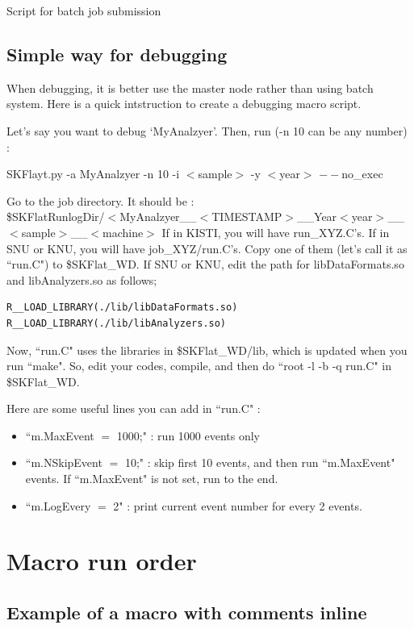 \documentclass[12pt, a4paper, titlepage]{article}
\begin{document}
Script for batch job submission

\subsection{Simple way for debugging}

When debugging, it is better use the master node rather than using batch system.
Here is a quick intstruction to create a debugging macro script.

Let's say you want to debug `MyAnalzyer'.
Then, run (-n 10 can be any number) : \\
\centerline{SKFlayt.py -a MyAnalzyer -n 10 -i $<$sample$>$ -y $<$year$>$ $--$no\_exec}
Go to the job directory. It should be : \\
\$SKFlatRunlogDir/$<$MyAnalzyer\_\_$<$TIMESTAMP$>$\_\_Year$<$year$>$\_\_$<$sample$>$\_\_$<$machine$>$
If in KISTI, you will have run\_XYZ.C's.
If in SNU or KNU, you will have job\_XYZ/run.C's.
Copy one of them (let's call it as ``run.C") to \$SKFlat\_WD.
If SNU or KNU, edit the path for libDataFormats.so and libAnalyzers.so as follows;
\begin{lstlisting}
R__LOAD_LIBRARY(./lib/libDataFormats.so)
R__LOAD_LIBRARY(./lib/libAnalyzers.so)
\end{lstlisting}
Now, ``run.C" uses the libraries in \$SKFlat\_WD/lib, which is updated when you run ``make".
So, edit your codes, compile, and then do ``root -l -b -q run.C" in \$SKFlat\_WD.

Here are some useful lines you can add in ``run.C" :
\begin{itemize}
\item ``m.MaxEvent $=$ 1000;" : run 1000 events only
\item ``m.NSkipEvent $=$ 10;" : skip first 10 events, and then run ``m.MaxEvent" events. If ``m.MaxEvent" is not set, run to the end.
\item ``m.LogEvery $=$ 2" : print current event number for every 2 events.
\end{itemize}

\clearpage

\section{Macro run order}

\subsection{Example of a macro with comments inline}
\end{document}
